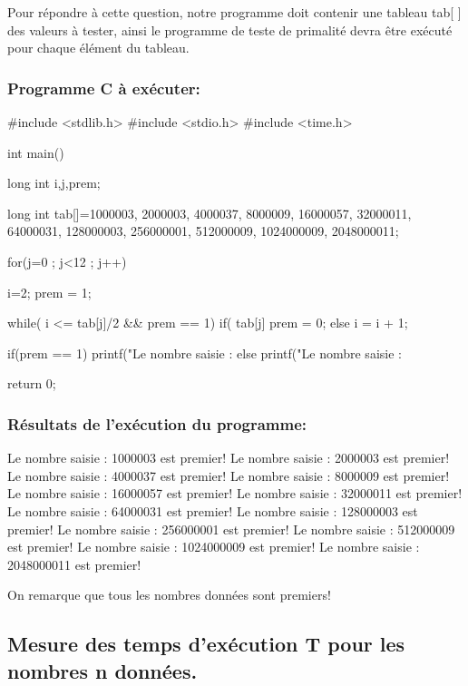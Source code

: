 \documentclass[12pt]{article}
\begin{document}
Pour répondre à cette question, notre programme doit contenir une tableau tab[ ] des valeurs à tester, ainsi le programme de teste de primalité devra être exécuté pour chaque élément du tableau.

\subsubsection{Programme C à exécuter:}

\begin{sql}
#include <stdlib.h>
#include <stdio.h>
#include <time.h>

int main()
{
	long int i,j,prem;

	long int tab[]={1000003, 2000003, 4000037, 8000009, 16000057, 32000011, 64000031, 128000003, 256000001, 512000009,	1024000009,	2048000011};

for(j=0 ; j<12 ; j++)
{
	i=2;
	prem = 1;
	
	while( i <= tab[j]/2 && prem == 1){
		if( tab[j]%
			prem = 0;
		else
			i = i + 1;
	}

	if(prem == 1)
    {
        printf("Le nombre saisie : %
    }
	else{
        printf("Le nombre saisie : %
	}
}
return 0;
}
\end{sql}

\subsubsection{Résultats de l'exécution du programme:}
\begin{sql}
Le nombre saisie : 1000003 est premier!
Le nombre saisie : 2000003 est premier!
Le nombre saisie : 4000037 est premier!
Le nombre saisie : 8000009 est premier!
Le nombre saisie : 16000057 est premier!
Le nombre saisie : 32000011 est premier!
Le nombre saisie : 64000031 est premier!
Le nombre saisie : 128000003 est premier!
Le nombre saisie : 256000001 est premier!
Le nombre saisie : 512000009 est premier!
Le nombre saisie : 1024000009 est premier!
Le nombre saisie : 2048000011 est premier!
\end{sql}

On remarque que tous les nombres données sont premiers!

\subsection{Mesure des temps d'exécution T pour les nombres n données.}
\end{document}
